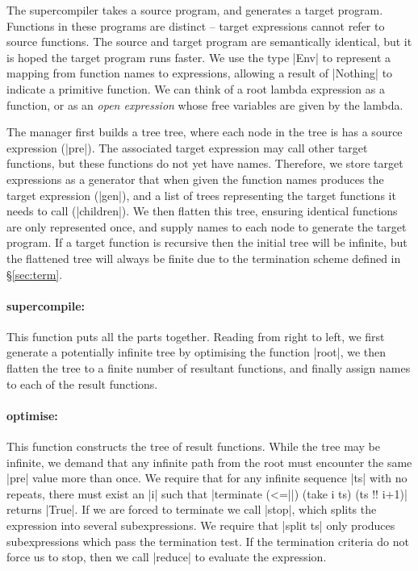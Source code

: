 \documentclass[draft]{sigplanconf}
\begin{document}
The supercompiler takes a source program, and generates a target program. Functions in these programs are distinct -- target expressions cannot refer to source functions. The source and target program are semantically identical, but it is hoped the target program runs faster. We use the type |Env| to represent a mapping from function names to expressions, allowing a result of |Nothing| to indicate a primitive function. We can think of a root lambda expression as a function, or as an \textit{open expression} whose free variables are given by the lambda.

The manager first builds a tree tree, where each node in the tree is has a source expression (|pre|). The associated target expression may call other target functions, but these functions do not yet have names. Therefore, we store target expressions as a generator that when given the function names produces the target expression (|gen|), and a list of trees representing the target functions it needs to call (|children|). We then flatten this tree, ensuring identical functions are only represented once, and supply names to each node to generate the target program. If a target function is recursive then the initial tree will be infinite, but the flattened tree will always be finite due to the termination scheme defined in \S\ref{sec:term}.

\newcommand{\function}[1]{\paragraph{\textsf{#1:}}\hspace{-3mm}}

\function{supercompile} This function puts all the parts together. Reading from right to left, we first generate a potentially infinite tree by optimising the function |root|, we then flatten the tree to a finite number of resultant functions, and finally assign names to each of the result functions.

\function{optimise} This function constructs the tree of result functions. While the tree may be infinite, we demand that any infinite path from the root must encounter the same |pre| value more than once. We require that for any infinite sequence |ts| with no repeats, there must exist an |i| such that |terminate (<=||) (take i ts) (ts !! i+1)| returns |True|. If we are forced to terminate we call |stop|, which splits the expression into several subexpressions. We require that |split ts| only produces subexpressions which pass the termination test. If the termination criteria do not force us to stop, then we call |reduce| to evaluate the expression.
\end{document}
